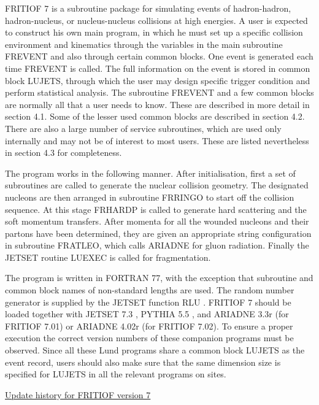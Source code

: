 FRITIOF 7 is a subroutine package for simulating events of hadron-hadron,
hadron-nucleus, or nucleus-nucleus collisions at high energies.  A user
is expected to construct his own main program, in which he must set up
a specific collision environment and kinematics through the variables in
the main subroutine FREVENT and also through certain common blocks.  
One event is generated each time FREVENT is called.  
The full information on the event
is stored in common block LUJETS, through which the user may design
specific trigger condition and perform statistical analysis.  
The subroutine FREVENT and a few common blocks are normally all that
a user needs to know.  These are described in more detail in section 4.1.
Some of the lesser used common blocks are described in section 4.2. 
There are also a large number of service subroutines, which are used
only internally and may not be of interest to most users.  These are listed
nevertheless in section 4.3 for completeness.  

The program works in the following manner. After initialisation, first a set of subroutines are called to generate the nuclear collision geometry.  The designated nucleons are then arranged in subroutine FRRINGO to start off 
the collision sequence.  At this stage FRHARDP is called to generate 
hard scattering and the soft momentum transfers.
After momenta for all the wounded nucleons and their partons have been determined, they are given an 
appropriate string configuration
in subroutine FRATLEO, which calls ARIADNE for gluon 
radiation.  Finally the JETSET routine LUEXEC is called for fragmentation.

The program is written in FORTRAN 77, with the exception that subroutine and
common block names of non-standard lengths are used. 
The random number generator is supplied
by the JETSET function RLU \cite{j73}. 
FRITIOF 7 should be loaded together with
JETSET 7.3 \cite{j73}, PYTHIA 5.5 \cite{pyth}, and ARIADNE 3.3r \cite{aria}
(for FRITIOF 7.01) or ARIADNE 4.02r \cite{arian} (for FRITIOF 7.02).  
To ensure a proper execution the correct version numbers of these companion programs must be observed.  Since all these
Lund programs share a common block LUJETS as the event record, users should
also make sure that the same dimension size is specified for LUJETS in all
the relevant programs on sites.

\begin{flushleft}
\underline{Update history for FRITIOF version 7} 
\end{flushleft}

